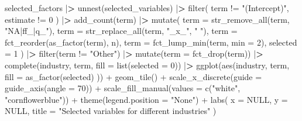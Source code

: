 \documentclass[
]{book}
\newenvironment{Shaded}{\begin{snugshade}}{\end{snugshade}}
\newcommand{\AttributeTok}[1]{\textcolor[rgb]{0.61,0.61,0.61}{#1}}
\newcommand{\ConstantTok}[1]{\textcolor[rgb]{0,0,0}{#1}}
\newcommand{\DecValTok}[1]{\textcolor[rgb]{0.06,0.06,0.06}{#1}}
\newcommand{\ErrorTok}[1]{\textcolor[rgb]{0.14,0.14,0.14}{\textbf{#1}}}
\newcommand{\FunctionTok}[1]{\textcolor[rgb]{0,0,0}{#1}}
\newcommand{\NormalTok}[1]{#1}
\newcommand{\SpecialCharTok}[1]{\textcolor[rgb]{0,0,0}{#1}}
\newcommand{\StringTok}[1]{\textcolor[rgb]{0.5,0.5,0.5}{#1}}
\begin{document}
\begin{Shaded}
\begin{Highlighting}[]
\NormalTok{selected\_factors }\SpecialCharTok{|}\ErrorTok{\textgreater{}}
  \FunctionTok{unnest}\NormalTok{(selected\_variables) }\SpecialCharTok{|}\ErrorTok{\textgreater{}}
  \FunctionTok{filter}\NormalTok{(}
\NormalTok{    term }\SpecialCharTok{!=} \StringTok{"(Intercept)"}\NormalTok{,}
\NormalTok{    estimate }\SpecialCharTok{!=} \DecValTok{0}
\NormalTok{  ) }\SpecialCharTok{|}\ErrorTok{\textgreater{}}
  \FunctionTok{add\_count}\NormalTok{(term) }\SpecialCharTok{|}\ErrorTok{\textgreater{}}
  \FunctionTok{mutate}\NormalTok{(}
    \AttributeTok{term =} \FunctionTok{str\_remove\_all}\NormalTok{(term, }\StringTok{"NA|ff\_|q\_"}\NormalTok{),}
    \AttributeTok{term =} \FunctionTok{str\_replace\_all}\NormalTok{(term, }\StringTok{"\_x\_"}\NormalTok{, }\StringTok{" "}\NormalTok{),}
    \AttributeTok{term =} \FunctionTok{fct\_reorder}\NormalTok{(}\FunctionTok{as\_factor}\NormalTok{(term), n),}
    \AttributeTok{term =} \FunctionTok{fct\_lump\_min}\NormalTok{(term, }\AttributeTok{min =} \DecValTok{2}\NormalTok{),}
    \AttributeTok{selected =} \DecValTok{1}
\NormalTok{  ) }\SpecialCharTok{|}\ErrorTok{\textgreater{}}
  \FunctionTok{filter}\NormalTok{(term }\SpecialCharTok{!=} \StringTok{"Other"}\NormalTok{) }\SpecialCharTok{|}\ErrorTok{\textgreater{}}
  \FunctionTok{mutate}\NormalTok{(}\AttributeTok{term =} \FunctionTok{fct\_drop}\NormalTok{(term)) }\SpecialCharTok{|}\ErrorTok{\textgreater{}}
  \FunctionTok{complete}\NormalTok{(industry, term, }\AttributeTok{fill =} \FunctionTok{list}\NormalTok{(}\AttributeTok{selected =} \DecValTok{0}\NormalTok{)) }\SpecialCharTok{|}\ErrorTok{\textgreater{}}
  \FunctionTok{ggplot}\NormalTok{(}\FunctionTok{aes}\NormalTok{(industry,}
\NormalTok{    term,}
    \AttributeTok{fill =} \FunctionTok{as\_factor}\NormalTok{(selected)}
\NormalTok{  )) }\SpecialCharTok{+}
  \FunctionTok{geom\_tile}\NormalTok{() }\SpecialCharTok{+}
  \FunctionTok{scale\_x\_discrete}\NormalTok{(}\AttributeTok{guide =} \FunctionTok{guide\_axis}\NormalTok{(}\AttributeTok{angle =} \DecValTok{70}\NormalTok{)) }\SpecialCharTok{+}
  \FunctionTok{scale\_fill\_manual}\NormalTok{(}\AttributeTok{values =} \FunctionTok{c}\NormalTok{(}\StringTok{"white"}\NormalTok{, }\StringTok{"cornflowerblue"}\NormalTok{)) }\SpecialCharTok{+}
  \FunctionTok{theme}\NormalTok{(}\AttributeTok{legend.position =} \StringTok{"None"}\NormalTok{) }\SpecialCharTok{+}
  \FunctionTok{labs}\NormalTok{(}
    \AttributeTok{x =} \ConstantTok{NULL}\NormalTok{, }\AttributeTok{y =} \ConstantTok{NULL}\NormalTok{,}
    \AttributeTok{title =} \StringTok{"Selected variables for different industries"}
\NormalTok{  )}
\end{Highlighting}
\end{Shaded}
\end{document}

